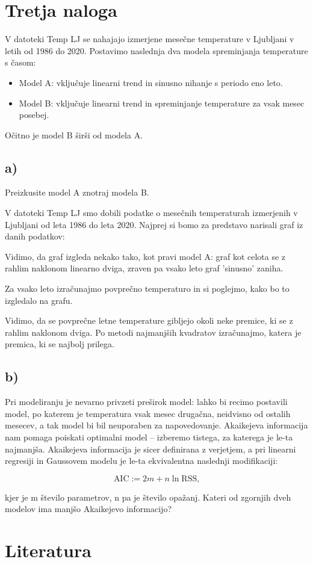 \documentclass[12pt, a4paper]{article}
\begin{document}
\section*{Tretja naloga}

V datoteki Temp LJ se nahajajo izmerjene mesečne temperature v Ljubljani v 
letih od 1986 do 2020. Postavimo naslednja dva modela spreminjanja temperature
s časom: 

\begin{itemize}
     
    \item Model A: vključuje linearni trend in sinusno nihanje s periodo eno 
        leto.
    \item Model B: vključuje linearni trend in spreminjanje temperature za 
        vsak mesec posebej.

\end{itemize}

Očitno je model B širši od modela A.

\subsection*{a)}

Preizkusite model A znotraj modela B.

V datoteki Temp LJ smo dobili podatke o mesečnih temperaturah izmerjenih
v Ljubljani od leta 1986 do leta 2020. Najprej si bomo za predstavo narisali 
graf iz danih podatkov:


Vidimo, da graf izgleda nekako tako, kot pravi model A: graf kot celota se z
rahlim naklonom linearno dviga, zraven pa vsako leto graf 'sinusno' zaniha.

Za vsako leto izračunajmo povprečno temperaturo in si poglejmo, kako bo to 
izgledalo na grafu.


Vidimo, da se povprečne letne temperature gibljejo okoli neke premice, ki se 
z rahlim naklonom dviga. Po metodi najmanjših kvadratov izračunajmo, katera je 
premica, ki se najbolj prilega. 

\subsection*{b)}
Pri modeliranju je nevarno privzeti preširok model: lahko bi recimo postavili
model, po katerem je temperatura vsak mesec drugačna, neidvisno od ostalih
mesecev, a tak model bi bil neuporaben za napovedovanje. Akaikejeva 
informacija nam pomaga poiskati optimalni model – izberemo tistega, za katerega
je le-ta najmanjša. Akaikejeva informacija je sicer definirana z verjetjem, 
a pri linearni regresiji in Gaussovem modelu je le-ta ekvivalentna naslednji 
modifikaciji:  

\[
    \text{AIC} := 2m + n \ln \text{RSS,}
    \]

kjer je m število parametrov, n pa je število opažanj. Kateri od zgornjih dveh
modelov ima manjšo Akaikejevo informacijo?



\section*{Literatura}
\end{document}
